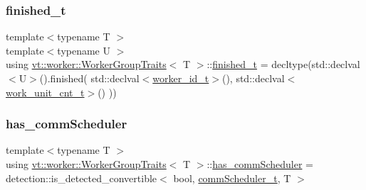 \mbox{\label{structvt_1_1worker_1_1_worker_group_traits_a6553b883b8acf8e1f1eb3ee24534d093}} 
\subsubsection{\texorpdfstring{finished\+\_\+t}{finished\_t}}
{\footnotesize\ttfamily template$<$typename T $>$ \\
template$<$typename U $>$ \\
using \hyperlink{structvt_1_1worker_1_1_worker_group_traits}{vt\+::worker\+::\+Worker\+Group\+Traits}$<$ T $>$\+::\hyperlink{structvt_1_1worker_1_1_worker_group_traits_a6553b883b8acf8e1f1eb3ee24534d093}{finished\+\_\+t} =  decltype(std\+::declval$<$U$>$().finished( std\+::declval$<$\hyperlink{structvt_1_1worker_1_1_worker_group_traits_a227b8add8f3fae6004adc05d5e85204f}{worker\+\_\+id\+\_\+t}$>$(), std\+::declval$<$\hyperlink{structvt_1_1worker_1_1_worker_group_traits_af8719962bd8fc468206bb7a0de8e29be}{work\+\_\+unit\+\_\+cnt\+\_\+t}$>$() ))}

\mbox{\label{structvt_1_1worker_1_1_worker_group_traits_a865df688c9b5f7fc67ebfcee3bca1273}} 
\subsubsection{\texorpdfstring{has\+\_\+comm\+Scheduler}{has\_commScheduler}}
{\footnotesize\ttfamily template$<$typename T $>$ \\
using \hyperlink{structvt_1_1worker_1_1_worker_group_traits}{vt\+::worker\+::\+Worker\+Group\+Traits}$<$ T $>$\+::\hyperlink{structvt_1_1worker_1_1_worker_group_traits_a865df688c9b5f7fc67ebfcee3bca1273}{has\+\_\+comm\+Scheduler} =  detection\+::is\+\_\+detected\+\_\+convertible$<$ bool, \hyperlink{structvt_1_1worker_1_1_worker_group_traits_a97c79042b7a6588067d2fdf836fc38ab}{comm\+Scheduler\+\_\+t}, T $>$}

